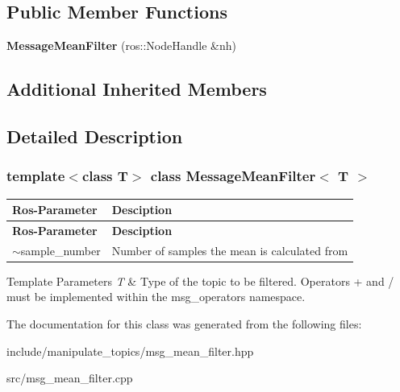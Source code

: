 \subsection*{Public Member Functions}
\begin{DoxyCompactItemize}
\item 
\mbox{\label{classMessageMeanFilter_a613460b271336914553f2beb05f4da9b}} 
{\bfseries Message\+Mean\+Filter} (ros\+::\+Node\+Handle \&nh)
\end{DoxyCompactItemize}
\subsection*{Additional Inherited Members}


\subsection{Detailed Description}
\subsubsection*{template$<$class T$>$\newline
class Message\+Mean\+Filter$<$ T $>$}

\tabulinesep=1mm
\begin{longtabu} spread 0pt [c]{*{2}{|X[-1]}|}
\hline
\rowcolor{\tableheadbgcolor}\textbf{ Ros-\/\+Parameter }&\textbf{ Desciption  }\\
\endfirsthead
\hline
\endfoot
\hline
\rowcolor{\tableheadbgcolor}\textbf{ Ros-\/\+Parameter }&\textbf{ Desciption  }\\
\endhead
$\sim$sample\+\_\+number &Number of samples the mean is calculated from \\
\end{longtabu}

\begin{DoxyTemplParams}{Template Parameters}
{\em T} & Type of the topic to be filtered. Operators + and / must be implemented within the msg\+\_\+operators namespace. \\
\hline
\end{DoxyTemplParams}


The documentation for this class was generated from the following files\+:\begin{DoxyCompactItemize}
\item 
include/manipulate\+\_\+topics/msg\+\_\+mean\+\_\+filter.\+hpp\item 
src/msg\+\_\+mean\+\_\+filter.\+cpp\end{DoxyCompactItemize}
